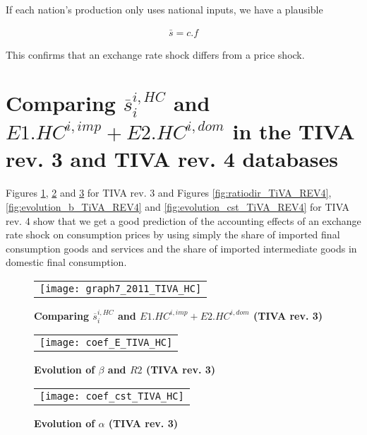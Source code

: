 \documentclass[11pt,a4paper]{article}
\begin{document}
If each nation's production only uses national inputs, we have a plausible

\begin{gather*}
\bar{s}=c.f
\end{gather*}

This confirms that an exchange rate shock differs from a price shock.

\newpage
\section{Comparing $\overline{s}_{i}^{i,HC}$ and $E1.HC^{i,imp}+E2.HC^{i,dom}$ in the TIVA rev. 3 and TIVA rev. 4 databases} \label{AppendixFonctionLinéaireTIVA}

Figures \ref{fig:ratiodir_TiVA}, \ref{fig:evolution_b_TiVA} and \ref{fig:evolution_cst_TiVA} for TIVA rev. 3 and Figures \ref{fig:ratiodir_TiVA_REV4}, \ref{fig:evolution_b_TiVA_REV4} and \ref{fig:evolution_cst_TiVA_REV4} for TIVA rev. 4 show that we get a good prediction of the accounting effects of an exchange rate shock on consumption prices by using simply the share of imported final consumption goods and services and the share of imported intermediate goods in domestic final consumption.




\begin{figure}[!h]
	\centering
	\caption{\footnotesize{\textbf{Comparing $\overline{s}_{i}^{i,HC}$ and $E1.HC^{i,imp}+E2.HC^{i,dom}$ (TIVA rev. 3)}}}
	\begin{tabular}{c}
		\texttt{[image: graph7\_2011\_TIVA\_HC]}\\
	\end{tabular}
	\label{fig:ratiodir_TiVA}
\end{figure}

\begin{figure}[!h]
	\centering
	\caption{\footnotesize{\textbf{Evolution of $\beta$ and $R2$ (TIVA rev. 3)}}}
	\begin{tabular}{c}
		\texttt{[image: coef\_E\_TIVA\_HC]}\\
	\end{tabular}
	\label{fig:evolution_b_TiVA}
\end{figure}

\begin{figure}[!h]
	\centering
	\caption{\footnotesize{\textbf{Evolution of $\alpha$ (TIVA rev. 3)}}}
	\begin{tabular}{c}
		\texttt{[image: coef\_cst\_TIVA\_HC]}\\
	\end{tabular}
	\label{fig:evolution_cst_TiVA}
\end{figure}
\end{document}
